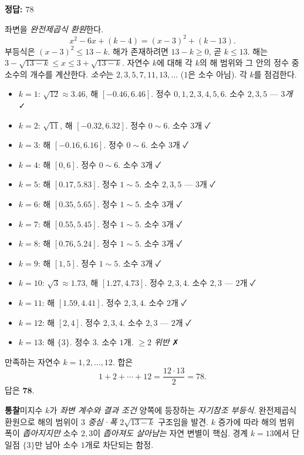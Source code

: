 \documentclass[10pt]{article}
\newcommand{\solnote}[1]{\par\smallskip\noindent
  \begin{tcolorbox}[enhanced, breakable, colback=vB-light, colframe=vB-light,
    boxrule=0pt, arc=3pt, left=10pt, right=10pt, top=4pt, bottom=4pt,
    fontupper=\sffamily\footnotesize\color{vB-ink}]
    \textbf{\color{vB-deep}통찰}\quad #1
  \end{tcolorbox}}
\begin{document}

\begin{answerbox}\sffamily\bfseries 정답: $78$\end{answerbox}
 좌변을 \emph{완전제곱식 환원}한다.
\[ x^2 - 6x + (k - 4) = (x - 3)^2 + (k - 13). \]
 부등식은 $(x - 3)^2 \le 13 - k$. 해가 존재하려면 $13 - k \ge 0$, 곧 $k \le 13$.
 해는 $3 - \sqrt{13 - k} \le x \le 3 + \sqrt{13 - k}$. 자연수 $k$에 대해 각 $k$의 해 범위와 그 안의 정수 중 소수의 개수를 계산한다.
 \emph{소수}는 $2, 3, 5, 7, 11, 13, \ldots$ ($1$은 소수 아님).
 각 $k$를 점검한다.
\begin{itemize}\setlength{\itemsep}{0pt}
\item $k = 1$: $\sqrt{12} \approx 3.46$, 해 $[-0.46, 6.46]$. 정수 $0, 1, 2, 3, 4, 5, 6$. 소수 $2, 3, 5$ — \emph{$3$개} ✓
\item $k = 2$: $\sqrt{11}$, 해 $[-0.32, 6.32]$. 정수 $0\sim6$. 소수 $3$개 ✓
\item $k = 3$: 해 $[-0.16, 6.16]$. 정수 $0\sim6$. 소수 $3$개 ✓
\item $k = 4$: 해 $[0, 6]$. 정수 $0\sim6$. 소수 $3$개 ✓
\item $k = 5$: 해 $[0.17, 5.83]$. 정수 $1\sim5$. 소수 $2, 3, 5$ — $3$개 ✓
\item $k = 6$: 해 $[0.35, 5.65]$. 정수 $1\sim5$. 소수 $3$개 ✓
\item $k = 7$: 해 $[0.55, 5.45]$. 정수 $1\sim5$. 소수 $3$개 ✓
\item $k = 8$: 해 $[0.76, 5.24]$. 정수 $1\sim5$. 소수 $3$개 ✓
\item $k = 9$: 해 $[1, 5]$. 정수 $1\sim5$. 소수 $3$개 ✓
\item $k = 10$: $\sqrt{3} \approx 1.73$, 해 $[1.27, 4.73]$. 정수 $2, 3, 4$. 소수 $2, 3$ — $2$개 ✓
\item $k = 11$: 해 $[1.59, 4.41]$. 정수 $2, 3, 4$. 소수 $2$개 ✓
\item $k = 12$: 해 $[2, 4]$. 정수 $2, 3, 4$. 소수 $2, 3$ — $2$개 ✓
\item $k = 13$: 해 $\{3\}$. 정수 $3$. 소수 $1$개. \emph{$\ge 2$ 위반} ✗
\end{itemize}
 만족하는 자연수 $k = 1, 2, \ldots, 12$. 합은
\[ 1 + 2 + \cdots + 12 = \frac{12 \cdot 13}{2} = 78. \]
답은 $\textbf{78}$.
\solnote{미지수 $k$가 \emph{좌변 계수와 결과 조건} 양쪽에 등장하는 \emph{자기참조 부등식}. 완전제곱식 환원으로 해의 범위이 \emph{$3$ 중심·폭 $2\sqrt{13-k}$} 구조임을 발견. $k$ 증가에 따라 해의 범위 폭이 \emph{좁아지지만} 소수 $2, 3$이 \emph{좁아져도 살아남는} 자연 변별이 핵심. 경계 $k = 13$에서 단일점 $\{3\}$만 남아 소수 $1$개로 차단되는 함정.}
\end{document}

